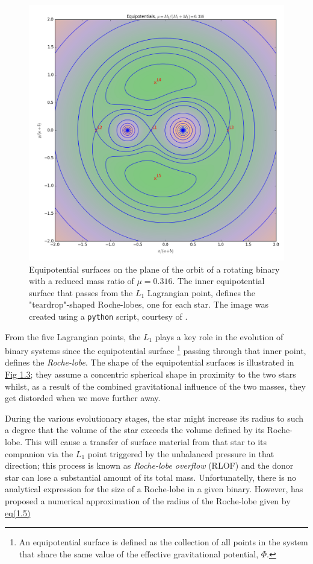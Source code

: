 \documentclass[../../main/thesis_msc.tex]{subfiles}
\begin{document}
				\begin{figure}[h]
					\centering
					\includegraphics[scale=0.4]{../figures/chapter1/equipotential_surfaces/equipotentials_mu_0_316.png}
					\caption{Equipotential surfaces on the plane of the orbit of a rotating binary with a reduced mass ratio of $\mu = 0.316$. The inner equipotential surface that passes from the $L_1$ Lagrangian point, defines the "teardrop"-shaped Roche-lobes, one for each star. The image was created using a \texttt{python} script, courtesy of \cite{Zingale}.}
					\label{fig:eq_sur}
				\end{figure}
				
				From the five Lagrangian points, the $L_1$ plays a key role in the evolution of binary systems since the equipotential surface \footnote{An equipotential surface is defined as the collection of all points in the system that share the same value of the effective gravitational potential, $\Phi$.} passing through that inner point, defines the \emph{Roche-lobe}. The shape of the equipotential surfaces is illustrated in \hyperref[fig:eq_sur]{Fig 1.3}; they assume a concentric spherical shape in proximity to the two stars whilst, as a result of the combined gravitational influence of the two masses, they get distorded when we move further away.
				
				During the various evolutionary stages, the star might increase its radius to such a degree that the volume of the star exceeds the volume defined by its Roche-lobe. This will cause a transfer of surface material from that star to its companion via the $L_1$ point triggered by the unbalanced pressure in that direction; this process is known as \emph{Roche-lobe overflow} (RLOF) and the donor star can lose a substantial amount of its total mass. Unfortunatelly, there is no analytical expression for the size of a Roche-lobe in a given binary. However, \cite{Eggleton1983} has proposed a numerical approximation of the radius of the Roche-lobe given by \hyperref[eq:rl_radius]{eq(1.5)}
				
\end{document}
